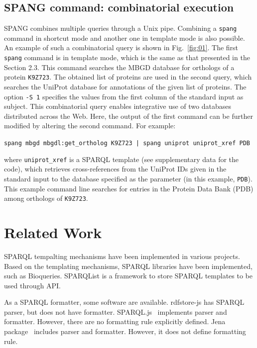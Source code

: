 \documentclass[runningheads]{llncs}
\begin{document}
\subsection{SPANG command: combinatorial execution}

SPANG combines multiple queries through a Unix pipe. 
Combining a {\tt spang} command in shortcut mode and another one in template mode is also possible.
An example of such a combinatorial query is shown in Fig.~\ref{fig:01}.
The first {\tt spang} command is in template mode, which is the same as that presented in the Section 2.3. 
This command searches the MBGD database for orthologs of a protein {\tt K9Z723}. 
The obtained list of proteins are used in the second query, which searches the UniProt database for annotations of the given list of proteins. 
The option \texttt{-S 1} specifies the values from the first column of the standard input as subject.
This combinatorial query enables integrative use of two databases distributed across the Web. 
Here, the output of the first command can be further modified by altering the second command.
For example:
\begin{quoting}
\texttt{spang mbgd mbgdl:get\_ortholog K9Z723 | spang uniprot uniprot\_xref PDB}
\vspace{1pt}
\end{quoting}
where {\tt uniprot\_xref} is a SPARQL template (see supplementary data for the code), which retrieves cross-references from the UniProt IDs given in the standard input to the database specified as the parameter (in this example, {\tt PDB}). This example command line searches for entries in the Protein Data Bank (PDB) \citep{Berman} among orthologs of {\tt K9Z723}.



\section{Related Work}

SPARQL tempalting mechanisms have been implemented in various projects. Based on the templating mechanisms, SPARQL libraries have been implemented, such as Bioqueries. SPARQList is a framework to store SPARQL templates to be used through API.

As a SPARQL formatter, some software are available.
rdfstore-js\cite{rdfstore-js} has SPARQL parser, but does not have formatter.
SPARQL.js~\cite{sparql-js} implements parser and formatter. However, there are no formatting rule explicitly defined.
Jena package~\cite{jena} includes parser and formatter. However, it does not define formatting rule.
\end{document}
